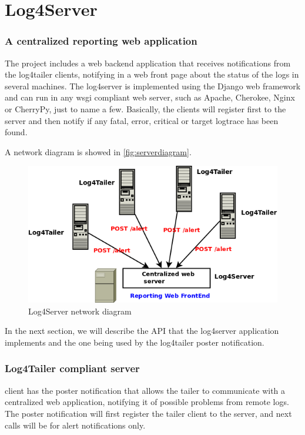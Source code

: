 \part{Log4Server}

\section{A centralized reporting web application}
\label{sec:log4server}
The \logftailer{} project includes a web backend application that receives
notifications from the log4tailer clients, notifying in a web front page about
the status of the logs in several machines. The log4server is implemented using
the Django web framework and can run in any wsgi compliant web server, such as
Apache, Cherokee, Nginx or CherryPy, just to name a few. Basically, the clients
will register first to the server and then notify if any fatal, error, critical
or target logtrace has been found. 

A network diagram is showed in \autoref{fig:serverdiagram}.

\begin{figure}[hb]
\centering
\includegraphics[scale=0.50]{serverdiagram.png}
\caption{Log4Server network diagram}\label{fig:serverdiagram}
\end{figure}


In the next section, we will describe the API that the log4server application implements and the 
one being used by the log4tailer poster notification.

\section{Log4Tailer compliant server}
\logftailer{} client has the poster notification that allows the tailer to communicate 
with a centralized web application, notifying it of possible problems from remote logs. 
The poster notification will first register the tailer client to the server, and next 
calls will be for alert notifications only.

